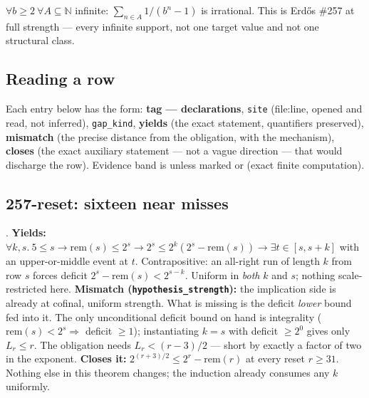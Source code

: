 \begin{defn}[257-universal]
$\forall b \ge 2\ \forall A \subseteq \mathbb{N}$ infinite: $\sum_{n \in A} 1/(b^n-1)$ is
irrational. This is Erdős \#257 at full strength — every infinite support, not one target
value and not one structural class.
\end{defn}

\subsection{Reading a row}

Each entry below has the form: \textbf{tag --- declarations}, \texttt{site} (file:line, opened
and read, not inferred), \texttt{gap\_kind}, \textbf{yields} (the exact statement, quantifiers
preserved), \textbf{mismatch} (the precise distance from the obligation, with the mechanism),
\textbf{closes} (the exact auxiliary statement — not a vague direction — that would discharge
the row). Evidence band is  unless marked  or  (exact finite
computation).

\subsection{257-reset: sixteen near misses}

\begin{obs} 
.
\textbf{Yields:} $\forall k, s.\ 5 \le s \to \mathrm{rem}(s) \le 2^s \to 2^s \le 2^k(2^s -
\mathrm{rem}(s)) \to \exists t \in [s,s+k]$ with an upper-or-middle event at $t$. Contrapositive:
an all-right run of length $k$ from row $s$ forces deficit $2^s - \mathrm{rem}(s) < 2^{s-k}$.
Uniform in \emph{both} $k$ and $s$; nothing scale-restricted here.
\textbf{Mismatch (\texttt{hypothesis\_strength}):} the implication side is already at cofinal,
uniform strength. What is missing is the deficit \emph{lower} bound fed into it. The only
unconditional deficit bound on hand is integrality ($\mathrm{rem}(s) < 2^s \Rightarrow$ deficit
$\ge 1$); instantiating $k=s$ with deficit $\ge 2^0$ gives only $L_r \le r$. The obligation needs
$L_r < (r-3)/2$ — short by exactly a factor of two in the exponent.
\textbf{Closes it:} $2^{(r+3)/2} \le 2^r - \mathrm{rem}(r)$ at every reset $r \ge 31$. Nothing else
in this theorem changes; the induction already consumes any $k$ uniformly.
\end{obs}

